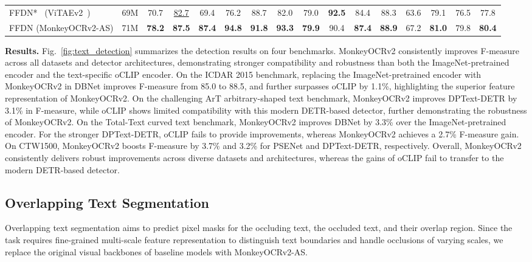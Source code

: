 \documentclass{article}
\begin{document}
\begin{table}[t]
{\begin{tabular}{ll|cc|cccc|cccc|cccc}
\midrule

FFDN*~\cite{chen2024enhancing} (ViTAEv2~\cite{vitaev2}) & 69M
& 70.7 & \underline{82.7}
& 69.4 & 76.2 &  88.7 & 82.0
& 79.0 & \textbf{92.5} & 84.4 & 88.3
& 63.6 & 79.1 & 76.5 & 77.8 \\
 
FFDN (MonkeyOCRv2-AS) & 71M
& \textbf{78.2} & \textbf{87.5}
& \textbf{87.4} & \textbf{94.8} & \textbf{91.8} & \textbf{93.3}
& \textbf{79.9} & 90.4 & \textbf{87.4} & \textbf{88.9}
& 67.2 & \textbf{81.0} & 79.8 & \textbf{80.4} \\

\bottomrule
\end{tabular}
}
\label{tab:doctamper_results}
\end{table}

    \textbf{Results.} Fig.~\ref{fig:text_detection} summarizes the detection results on four benchmarks. MonkeyOCRv2 consistently improves F-measure across all datasets and detector architectures, demonstrating stronger compatibility and robustness than both the ImageNet-pretrained encoder and the text-specific oCLIP encoder. On the ICDAR 2015 benchmark, replacing the ImageNet-pretrained encoder with MonkeyOCRv2 in DBNet improves F-measure from 85.0 to 88.5, and further surpasses oCLIP by 1.1\%, highlighting the superior feature representation of MonkeyOCRv2. On the challenging ArT arbitrary-shaped text benchmark, MonkeyOCRv2 improves DPText-DETR by 3.1\% in F-measure, while oCLIP shows limited compatibility with this modern DETR-based detector, further demonstrating the robustness of MonkeyOCRv2. On the Total-Text curved text benchmark, MonkeyOCRv2 improves DBNet by 3.3\% over the ImageNet-pretrained encoder. For the stronger DPText-DETR, oCLIP fails to provide improvements, whereas MonkeyOCRv2 achieves a 2.7\% F-measure gain. On CTW1500, MonkeyOCRv2 boosts F-measure by 3.7\% and 3.2\% for PSENet and DPText-DETR, respectively. 
    Overall, MonkeyOCRv2 consistently delivers robust improvements across diverse datasets and architectures, whereas the gains of oCLIP fail to transfer to the modern DETR-based detector.









\subsection{Overlapping Text Segmentation}
    Overlapping text segmentation aims to predict pixel masks for the occluding text, the occluded text, and their overlap region. Since the task requires fine-grained multi-scale feature representation to distinguish text boundaries and handle occlusions of varying scales, we replace the original visual backbones of baseline models with MonkeyOCRv2-AS.
    
\end{document}
